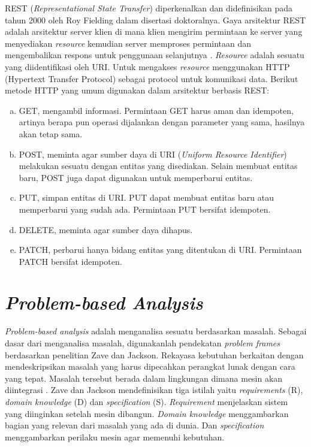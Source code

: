 REST (\textit{Representational State Transfer}) diperkenalkan dan didefinisikan pada tahun 2000 oleh Roy Fielding dalam disertasi doktoralnya. Gaya arsitektur REST adalah arsitektur server klien di mana klien mengirim permintaan ke server yang menyediakan \textit{resource} kemudian server memproses permintaan dan mengembalikan respons untuk penggunaan selanjutnya \citep{mumbaikar2013}. \textit{Resource} adalah sesuatu yang diidentifikasi oleh URI.  Untuk mengakses \textit{resource} menggunakan HTTP (Hypertext Transfer Protocol) sebagai protocol untuk komunikasi data. Berikut metode HTTP yang umum digunakan dalam arsitektur berbasis REST:
\begin{enumerate}[a.]
	\item GET, mengambil informasi. Permintaan GET harus aman dan idempoten, artinya berapa pun operasi dijalankan dengan parameter yang sama, hasilnya akan tetap sama. 
	\item POST, meminta agar sumber daya di URI (\textit{Uniform Resource Identifier}) melakukan sesuatu dengan entitas yang disediakan. Selain membuat entitas baru, POST juga dapat digunakan untuk memperbarui entitas.
	\item PUT, simpan entitas di URI. PUT dapat membuat entitas baru atau memperbarui yang sudah ada. Permintaan PUT bersifat idempoten.
	\item DELETE, meminta agar sumber daya dihapus.
	\item PATCH, perbarui hanya bidang entitas yang ditentukan di URI. Permintaan PATCH bersifat idempoten. 
\end{enumerate}

\section{\textit{Problem-based Analysis}}
\textit{Problem-based analysis} adalah menganalisa sesuatu berdasarkan masalah. Sebagai dasar dari menganalisa masalah, digunakanlah pendekatan \textit{problem frames} berdasarkan penelitian Zave dan Jackson. Rekayasa kebutuhan berkaitan dengan mendeskripsikan masalah yang harus dipecahkan perangkat lunak dengan cara yang tepat. Masalah tersebut berada dalam lingkungan dimana mesin akan diintegrasi \citep{cheng2007}. Zave dan Jackson mendefinisikan tiga istilah yaitu \textit{requirements} (R), \textit{domain knowledge} (D) dan \textit{specification} (S). \textit{Requirement} menjelaskan sistem yang diinginkan setelah mesin dibangun. \textit{Domain knowledge} menggambarkan bagian yang relevan dari masalah yang ada di dunia. Dan \textit{specification} menggambarkan perilaku mesin agar memenuhi kebutuhan.

